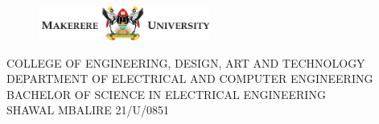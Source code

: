 \documentclass[12pt,a4paper]{article}
\begin{document}
    \begin{titlepage}
        \begin{center}
            \begin{figure}[H]
                \centering
                \includegraphics[width=0.5\textwidth]{mak_logo.png} %
            \end{figure}
            \vspace{20pt}
            \large COLLEGE OF ENGINEERING, DESIGN, ART AND TECHNOLOGY\\
            \vspace{10pt}
            DEPARTMENT OF ELECTRICAL AND COMPUTER ENGINEERING\\
            \vspace{20pt}
            BACHELOR OF SCIENCE IN ELECTRICAL ENGINEERING\\
            \vspace{20pt}
            SHAWAL MBALIRE 21/U/0851\\
            \vspace{20pt}


\end{center}
\end{titlepage}
\end{document}

